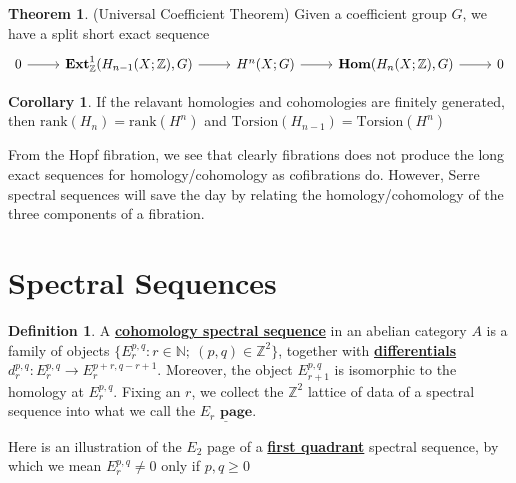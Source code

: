 \documentclass{article}
\theoremstyle{definition}
\newtheorem{theorem}{Theorem}[section]
\theoremstyle{definition}
\theoremstyle{definition}
\theoremstyle{definition}
\theoremstyle{definition}
\newtheorem{definition}{Definition}[section]
\theoremstyle{definition}
\newtheorem{corollary}{Corollary}[theorem]
\theoremstyle{definition}
\begin{document}
\begin{tcolorbox}[colback=red!5!white,colframe=red!30!white]
\begin{theorem}
    (Universal Coefficient Theorem) Given a coefficient group $G$, we have a split short exact sequence
    \[\begin{tikzcd}
    0\arrow[r]& \textbf{Ext}^1_{\mathbb{Z}}(H_{n-1}(X;\mathbb{Z}),G) \arrow[r]&H^n(X;G)\arrow[r]&\textbf{Hom}(H_n(X;\mathbb{Z}),G)\arrow[r]&0
    \end{tikzcd}\]
\end{theorem}
\end{tcolorbox}

\begin{tcolorbox}[colback=green!5!white,colframe=green!30!white]
\begin{corollary}
If the relavant homologies and cohomologies are finitely generated, then $\textrm{rank}(H_n)=\textrm{rank}(H^n)$ and $\textrm{Torsion}(H_{n-1})=\textrm{Torsion}(H^n)$
\end{corollary}
\end{tcolorbox}

From the Hopf fibration, we see that clearly fibrations does not produce the long exact sequences for homology/cohomology as cofibrations do. However, Serre spectral sequences will save the day by relating the homology/cohomology of the three components of a fibration. 
\section{Spectral Sequences}



\begin{tcolorbox}[colback=purple!5!white,colframe=purple!75!black]
\begin{definition}
A \underline{\textbf{cohomology spectral sequence}} in an abelian category $A$ is a family of objects $\{E_r^{p,q}: r\in \mathbb{N}; \ (p,q)\in \mathbb{Z}^2\}$, together with \underline{\textbf{differentials}} $d_r^{p,q}: E_r^{p,q}\to E_r^{p+r,q-r+1}$. Moreover, the object $E_{r+1}^{p,q}$ is isomorphic to the homology at $E_r^{p,q}$. Fixing an $r$, we collect the $\mathbb{Z}^2$ lattice of data of a spectral sequence into what we call the $\underline{ E_r \textbf{ page}}$.
\end{definition}
\end{tcolorbox}

Here is an illustration of the $E_2$ page of a \underline{\textbf{first quadrant}} spectral sequence, by which we mean $E_r^{p,q}\neq 0$ only if $p,q\geq 0$
\end{document}
